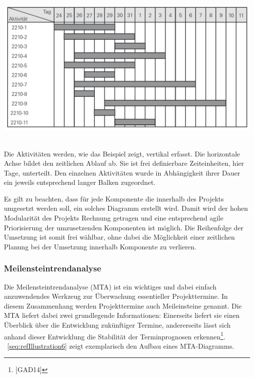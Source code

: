 \documentclass[a4paper]{article}
\makeatletter
\newcommand\captionof[1]{\def\@captype{#1}\caption}
\makeatother
\begin{document}
{\centering \includegraphics[width=15.323cm,height=7.856cm]{INMAusarbeitung02-img/INMAusarbeitung02-img006.png}
\captionof{figure}[Beispiel eines Gantt{}-Diagramms]{Beispiel eines Gantt-Diagramms}
\label{seq:refIllustration5}
\par}
{\sffamily
Die Aktivitäten werden, wie das Beispiel zeigt, vertikal erfasst. Die horizontale Achse bildet den zeitlichen Ablauf ab.
Sie ist frei definierbare Zeiteinheiten, hier Tage, unterteilt. Den einzelnen Aktivitäten wurde in Abhängigkeit ihrer
Dauer ein jeweils entsprechend langer Balken zugeordnet. }


\bigskip

{\sffamily
Es gilt zu beachten, dass für jede Komponente die innerhalb des Projekts umgesetzt werden soll, ein solches Diagramm
erstellt wird. Damit wird der hohen Modularität des Projekts Rechnung getragen und eine entsprechend agile
Priorisierung der umzusetzenden Komponenten ist möglich. Die Reihenfolge der Umsetzung ist somit frei wählbar, ohne
dabei die Möglichkeit einer zeitlichen Planung bei der Umsetzung innerhalb Komponente zu verlieren.}

\subsubsection[Meilensteintrendanalyse]{\color{black} Meilensteintrendanalyse}
{\sffamily
Die Meilensteintrendanalyse (MTA) ist ein wichtiges und dabei einfach anzuwendendes Werkzeug zur Überwachung
essentieller Projekttermine. In diesem Zusammenhang werden Projekttermine auch Meileinsteine genannt. Die MTA liefert
dabei zwei grundlegende Informationen: Einerseits liefert sie einen Überblick über die Entwicklung zukünftiger Termine,
andererseits lässt sich anhand dieser Entwicklung die Stabilität der Terminprognosen erkennen\footnote{[GAD14]}.
\figurename~\ref{seq:refIllustration6} zeigt exemplarisch den Aufbau eines MTA-Diagramms.}
\end{document}
